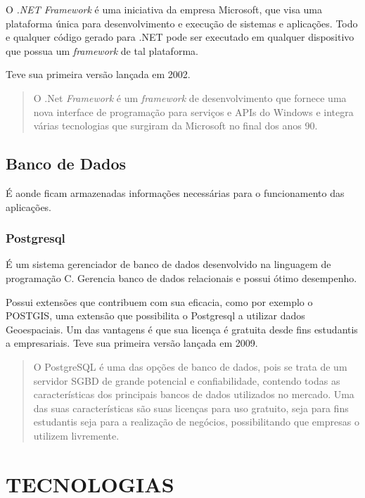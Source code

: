 O \textit{.NET Framework} é uma iniciativa da empresa Microsoft, que visa uma plataforma única para desenvolvimento e execução de sistemas e aplicações.
Todo e qualquer código gerado para .NET pode ser executado em qualquer dispositivo que possua um \textit{framework} de tal plataforma.

Teve sua primeira versão lançada em 2002.

\begin{quote}
  
O .Net \textit{Framework} é um \textit{framework} de desenvolvimento que fornece uma nova interface de programação para serviços e APIs do Windows e integra várias tecnologias que surgiram da Microsoft no final dos anos 90. \cite{thai2003net}
\end{quote}

\subsection{Banco de Dados}

É aonde ficam armazenadas informações necessárias para o funcionamento das aplicações.

\subsubsection{Postgresql}

É um sistema gerenciador de banco de dados desenvolvido na linguagem de programação C.
Gerencia banco de dados relacionais e possui ótimo desempenho.

Possui extensões que contribuem com sua eficacia, como por exemplo o POSTGIS, uma extensão que possibilita o Postgresql a utilizar dados Geoespaciais.
Um das vantagens é que sua licença é gratuita desde fins estudantis a empresariais.
Teve sua primeira versão lançada em 2009.

\begin{quote}
  O PostgreSQL é uma das opções de banco de dados, pois se trata de um servidor SGBD de grande potencial e confiabilidade, contendo todas as características dos principais bancos de dados utilizados no mercado. Uma das suas características são suas licenças para uso gratuito, seja para fins estudantis seja para a realização de negócios, possibilitando que empresas o utilizem livremente. \cite{postgres}
\end{quote}

\section{TECNOLOGIAS}
\label{cap:conclusao}

